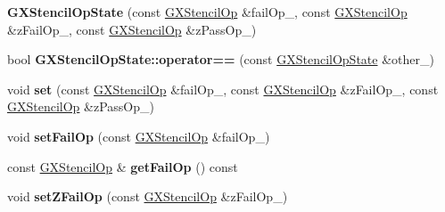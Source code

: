 \begin{DoxyCompactItemize}
\item 
{\bfseries G\+X\+Stencil\+Op\+State} (const \hyperlink{class_i_dream_sky_1_1_g_x_stencil_op}{G\+X\+Stencil\+Op} \&fail\+Op\+\_\+, const \hyperlink{class_i_dream_sky_1_1_g_x_stencil_op}{G\+X\+Stencil\+Op} \&z\+Fail\+Op\+\_\+, const \hyperlink{class_i_dream_sky_1_1_g_x_stencil_op}{G\+X\+Stencil\+Op} \&z\+Pass\+Op\+\_\+)\hypertarget{class_i_dream_sky_1_1_g_x_stencil_op_state_a19d33e79364d07972c58c394d620df58}{}\label{class_i_dream_sky_1_1_g_x_stencil_op_state_a19d33e79364d07972c58c394d620df58}

\item 
bool {\bfseries G\+X\+Stencil\+Op\+State\+::operator==} (const \hyperlink{class_i_dream_sky_1_1_g_x_stencil_op_state}{G\+X\+Stencil\+Op\+State} \&other\+\_\+)\hypertarget{class_i_dream_sky_1_1_g_x_stencil_op_state_af1676d54eb5e84ac152f26124c3a9afc}{}\label{class_i_dream_sky_1_1_g_x_stencil_op_state_af1676d54eb5e84ac152f26124c3a9afc}

\item 
void {\bfseries set} (const \hyperlink{class_i_dream_sky_1_1_g_x_stencil_op}{G\+X\+Stencil\+Op} \&fail\+Op\+\_\+, const \hyperlink{class_i_dream_sky_1_1_g_x_stencil_op}{G\+X\+Stencil\+Op} \&z\+Fail\+Op\+\_\+, const \hyperlink{class_i_dream_sky_1_1_g_x_stencil_op}{G\+X\+Stencil\+Op} \&z\+Pass\+Op\+\_\+)\hypertarget{class_i_dream_sky_1_1_g_x_stencil_op_state_a0d7ff2de2fbe3a6a65b1750602a81cd5}{}\label{class_i_dream_sky_1_1_g_x_stencil_op_state_a0d7ff2de2fbe3a6a65b1750602a81cd5}

\item 
void {\bfseries set\+Fail\+Op} (const \hyperlink{class_i_dream_sky_1_1_g_x_stencil_op}{G\+X\+Stencil\+Op} \&fail\+Op\+\_\+)\hypertarget{class_i_dream_sky_1_1_g_x_stencil_op_state_a3f6061400360cf57ffb0a57d958cbfa3}{}\label{class_i_dream_sky_1_1_g_x_stencil_op_state_a3f6061400360cf57ffb0a57d958cbfa3}

\item 
const \hyperlink{class_i_dream_sky_1_1_g_x_stencil_op}{G\+X\+Stencil\+Op} \& {\bfseries get\+Fail\+Op} () const \hypertarget{class_i_dream_sky_1_1_g_x_stencil_op_state_a2e4a4d6f7a06de41069c853092d31989}{}\label{class_i_dream_sky_1_1_g_x_stencil_op_state_a2e4a4d6f7a06de41069c853092d31989}

\item 
void {\bfseries set\+Z\+Fail\+Op} (const \hyperlink{class_i_dream_sky_1_1_g_x_stencil_op}{G\+X\+Stencil\+Op} \&z\+Fail\+Op\+\_\+)\hypertarget{class_i_dream_sky_1_1_g_x_stencil_op_state_afacbc4c19a6f71a6c391d531f2a43916}{}\label{class_i_dream_sky_1_1_g_x_stencil_op_state_afacbc4c19a6f71a6c391d531f2a43916}


\end{DoxyCompactItemize}

